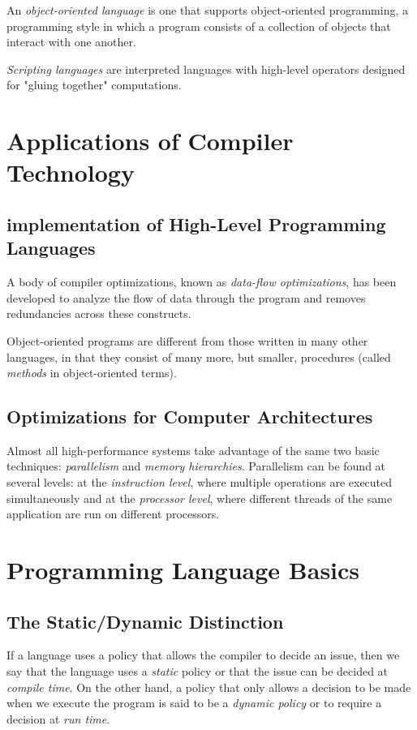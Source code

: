 \documentclass[12pt,a4paper,twoside,openany]{book}
\begin{document}
An \textit{object-oriented language} is one that supports object-oriented programming, a programming style in which a program consists of a collection of objects that interact with one another.

\textit{Scripting languages} are interpreted languages with high-level operators designed for "gluing together" computations.

\section{Applications of Compiler Technology}
\subsection{implementation of High-Level Programming Languages}

A body of compiler optimizations, known as \textit{data-flow optimizations}, has been developed to analyze the flow of data through the program and removes redundancies across these constructs.

Object-oriented programs are different from those written in many other languages, in that they consist of many more, but smaller, procedures (called \textit{methods} in object-oriented terms).

\subsection{Optimizations for Computer Architectures}

Almost all high-performance systems take advantage of the same two basic techniques: \textit{parallelism} and \textit{memory hierarchies}. Parallelism can be found at several levels: at the \textit{instruction level}, where multiple operations are executed simultaneously and at the \textit{processor level}, where different threads of the same application are run on different processors.

\section{Programming Language Basics}
\subsection{The Static/Dynamic Distinction}

If a language uses a policy that allows the compiler to decide an issue, then we say that the language uses a \textit{static} policy or that the issue can be decided at \textit{compile time}. On the other hand, a policy that only allows a decision to be made when we execute the program is said to be a \textit{dynamic policy} or to require a decision at \textit{run time}.
\end{document}
